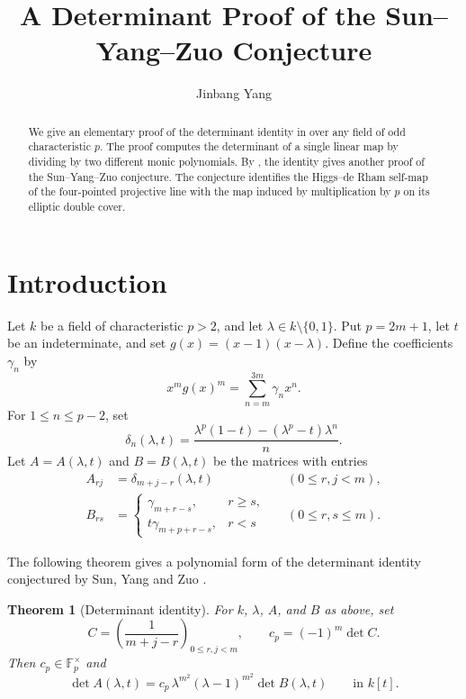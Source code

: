 \documentclass{amsart}
\newtheorem{theorem}{Theorem}
\numberwithin{equation}{section}
\begin{document}
\title{A Determinant Proof of the Sun--Yang--Zuo Conjecture}
\author{Jinbang Yang}
\date{}

\begin{abstract}
We give an elementary proof of the determinant identity in
\cite[Conjecture~A.1]{SYZ} over any field of odd characteristic $p$.
The proof computes the determinant of a single linear map by
dividing by two different monic polynomials.
By \cite[Proposition~A.9]{SYZ}, the identity gives another proof
of the Sun--Yang--Zuo conjecture.
The conjecture identifies the Higgs--de Rham self-map of
the four-pointed projective line with the map induced by
multiplication by $p$ on its elliptic double cover.
\end{abstract}

\maketitle
\section{Introduction}

Let $k$ be a field of characteristic $p>2$, and let
$\lambda\in k\setminus\{0,1\}$. Put $p=2m+1$, let $t$
be an indeterminate, and set $g(x)=(x-1)(x-\lambda)$.
Define the coefficients $\gamma_n$ by
\[
  x^m g(x)^m=\sum_{n=m}^{3m}\gamma_n x^n.
\]
For $1\le n\le p-2$, set
\[
  \delta_n(\lambda,t)
  =\frac{\lambda^p(1-t)-(\lambda^p-t)\lambda^n}{n}.
\]
Let $A=A(\lambda,t)$ and $B=B(\lambda,t)$ be the matrices
with entries
\begin{align*}
  A_{rj}
    &=\delta_{m+j-r}(\lambda,t)
    &&(0\le r,j<m),\\
  B_{rs}
    &=
    \begin{cases}
      \gamma_{m+r-s}, & r\ge s,\\
      t\gamma_{m+p+r-s}, & r<s
    \end{cases}
    &&(0\le r,s\le m).
\end{align*}

The following theorem gives a polynomial form of the
determinant identity conjectured by Sun, Yang and Zuo \cite[Conjecture~A.1]{SYZ}.

\begin{theorem}[Determinant identity]\label{thm_det}
For $k$, $\lambda$, $A$, and $B$ as above, set
\[
  C=\left(\frac{1}{m+j-r}\right)_{0\le r,j<m},
  \qquad c_p=(-1)^m\det C.
\]
Then $c_p\in\mathbb F_p^\times$ and
\begin{equation}\label{eq_det}
  \det A(\lambda,t)
    =c_p\,\lambda^{m^2}(\lambda-1)^{m^2}\det B(\lambda,t)
  \qquad\text{in }k[t].
\end{equation}
\end{theorem}
\end{document}
